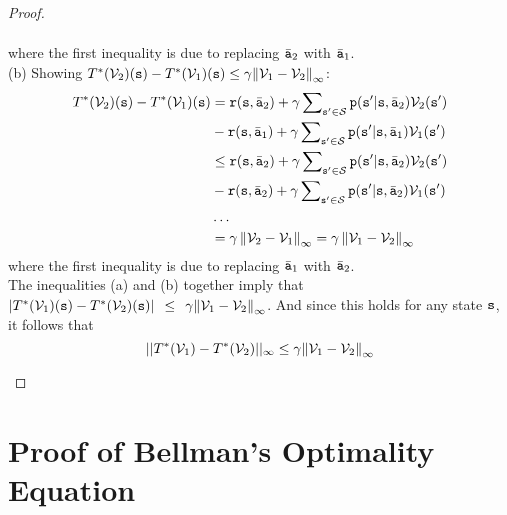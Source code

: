 \begin{proof}
\begin{enumerate}
\begin{align*}
\end{align*}
where the first inequality is due to replacing $\bar{{\tt a}}_{2}$ with $\bar{{\tt a}}_{1}$.\\
(b) Showing $T_{}^*({\mathcal{V}_2})({\tt s}) - T_{}^*({\mathcal{V}_1})({\tt s})
\le \gamma {\left\| {{\mathcal{V}_1} - {\mathcal{V}_2}} \right\|_\infty }$:
\begin{align*}
T^{*}({\mathcal{V}_{2}})({\tt s})-T^{*}({\mathcal{V}_{1}})({\tt s}) & ={\tt r}({\tt s},\bar{{\tt a}}_{2})+\gamma\sum\nolimits _{{\tt s}'\in\mathcal{S}}{{\tt p}({\tt s}'|{\tt s},\bar{{\tt a}}_{2}){\mathcal{V}_{2}}({\tt s}')}\\
 & -{\tt r}({\tt s},\bar{{\tt a}}_{1})+\gamma\sum\nolimits _{{\tt s}'\in\mathcal{S}}{{\tt p}({\tt s}'|{\tt s},\bar{{\tt a}}_{1}){\mathcal{V}_{1}}({\tt s}')}\\
 & \leq{\tt r}({\tt s},\bar{{\tt a}}_{2})+\gamma\sum\nolimits _{{\tt s}'\in\mathcal{S}}{{\tt p}({\tt s}'|{\tt s},\bar{{\tt a}}_{2}){\mathcal{V}_{2}}({\tt s}')}\\
 & -{\tt r}({\tt s},\bar{{\tt a}}_{2})+\gamma\sum\nolimits _{{\tt s}'\in\mathcal{S}}{{\tt p}({\tt s}'|{\tt s},\bar{{\tt a}}_{2}){\mathcal{V}_{1}}({\tt s}')}\\
 & \dots\\
 & =\gamma\left\Vert {\mathcal{V}_{2}}-{\mathcal{V}_{1}}\right\Vert _{\infty}=\gamma\left\Vert {\mathcal{V}_{1}}-{\mathcal{V}_{2}}\right\Vert _{\infty}
\end{align*}
where the first inequality is due to replacing $\bar{{\tt a}}_{1}$ with $\bar{{\tt a}}_{2}$.\\
The inequalities (a) and (b) together imply that
$|T_{}^*({\mathcal{V}_1})({\tt s}) - T_{}^*({\mathcal{V}_2})({\tt s})|\;\, \le
\;\,\gamma {\left\| {{\mathcal{V}_1} - {\mathcal{V}_2}} \right\|_\infty }$.
And since this holds for any state ${\tt s}$, it follows that
\[||T_{}^*({\mathcal{V}_1}) - T_{}^*({\mathcal{V}_2})|{|_\infty } \le \gamma
{\left\| {{\mathcal{V}_1} - {\mathcal{V}_2}} \right\|_\infty }\]
\end{enumerate}
\end{proof}


\section{Proof of Bellman's Optimality Equation}
\label{sec:Bellman-Opt}

